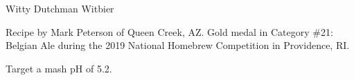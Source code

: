 \begin{recipe}{Witty Dutchman Witbier}

\begin{aboutblock}
Recipe by Mark Peterson of Queen Creek, AZ. Gold medal in Category \#21: Belgian
Ale during the 2019 National Homebrew Competition in Providence, RI. \sourceaha
\end{aboutblock}


\begin{methodandtiming}
 
\begin{mashsteps}
\end{mashsteps}

\begin{fermentationsteps}
\end{fermentationsteps}

\begin{directions}
Target a mash pH of 5.2.
\end{directions}

\end{methodandtiming}

\recipebreak

\begin{ingredientsblock}

\begin{malts}
\end{malts}

\begin{hops}
\end{hops}


\end{ingredientsblock}

\end{recipe}
